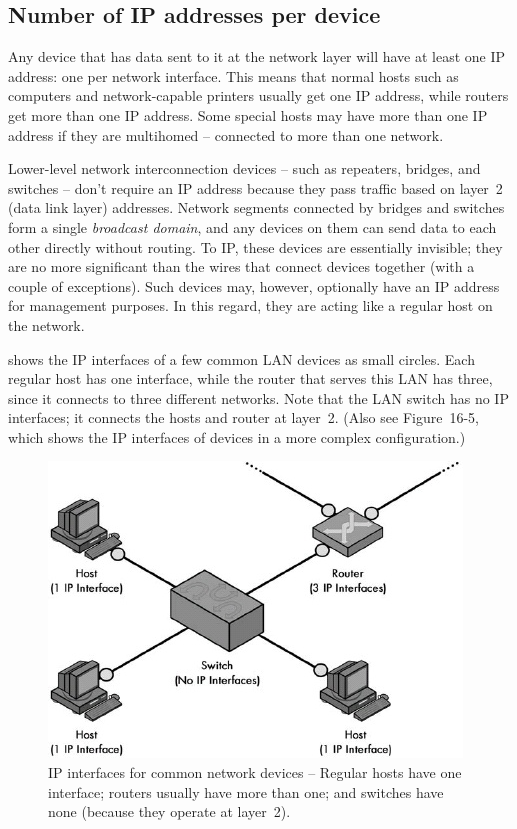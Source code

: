 \subsection{Number of IP addresses per device}

Any device that has data sent to it at the network layer will have at
least one IP address: one per network interface. This means that normal
hosts such as computers and network-capable printers usually get one IP
address, while routers get more than one IP address. Some special hosts
may have more than one IP address if they are multihomed -- connected to more than one network.

Lower-level network interconnection devices -- such as repeaters,
bridges, and switches -- don't require an IP address because they pass
traffic based on layer~2 (data link layer) addresses. Network segments
connected by bridges and switches form a single \emph{broadcast domain}, and any devices on them can send data to each other directly without routing.
To IP, these devices are essentially invisible; they are no
more significant than the wires that connect devices together (with a
couple of exceptions). Such devices may, however, optionally have an IP
address for management purposes. In this regard, they are acting like a
regular host on the network.

 shows the IP interfaces of a few common LAN devices as small circles.
Each regular host has one interface, while the router that serves this LAN has three, since it connects to three different networks.
Note that the LAN switch has no IP interfaces; it connects the hosts and router at layer~2.
(Also see Figure~16-5, which shows the IP interfaces of devices in a more complex configuration.)


\begin{figure}
   \centering
   \includegraphics[width=.6\textwidth]{images/ip-interfaces.jpg}
   \caption{IP interfaces for common network devices -- Regular hosts have one interface; routers usually have more than one; and switches have none (because they operate at layer~2).}
   \label{fig:ip-interfaces}
\end{figure}



